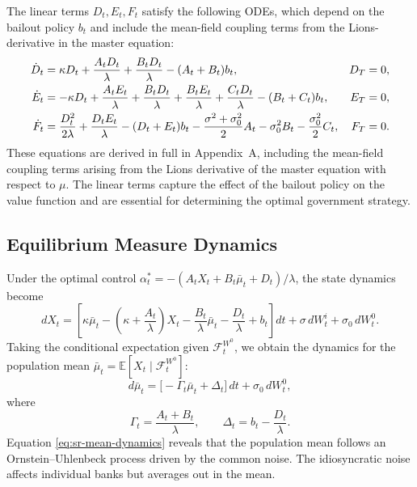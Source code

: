 The linear terms $D_t, E_t, F_t$ satisfy the following ODEs, which depend on the
bailout policy $b_t$ and include the mean-field coupling terms from the
Lions-derivative in the master equation:
\begin{align}
    \dot{D}_t &= \kappa D_t + \frac{A_t D_t}{\lambda} + \frac{B_t D_t}{\lambda}
        - (A_t+B_t) b_t, & D_T &= 0,
        \notag \\
    \dot{E}_t &= -\kappa D_t + \frac{A_t E_t}{\lambda} + \frac{B_t D_t}{\lambda}
        + \frac{B_t E_t}{\lambda} + \frac{C_t D_t}{\lambda}
        - (B_t+C_t) b_t, & E_T
        &= 0, \label{eq:sr-riccati-linear} \\
    \dot{F}_t &= \frac{D_t^2}{2\lambda} + \frac{D_t E_t}{\lambda}
        - (D_t+E_t) b_t - \frac{\sigma^2+\sigma_0^2}{2} A_t
        - \sigma_0^2 B_t - \frac{\sigma_0^2}{2} C_t, & F_T &= 0. \notag
\end{align}
These equations are derived in full in Appendix~A, including the mean-field coupling
terms arising from the Lions derivative of the master equation with respect to $\mu$.
The linear terms capture the effect of
the bailout policy on the value function and are essential for determining the
optimal government strategy.

\subsection{Equilibrium Measure Dynamics}

Under the optimal control $\alpha_t^* = -(A_t X_t + B_t \bar\mu_t + D_t)/\lambda$,
the state dynamics become
\[
    dX_t = \left[ \kappa\bar\mu_t - \left(\kappa + \frac{A_t}{\lambda}\right) X_t -
    \frac{B_t}{\lambda}\bar\mu_t - \frac{D_t}{\lambda} + b_t \right] dt + \sigma\,
    dW_t^i + \sigma_0\, dW_t^0.
\]
Taking the conditional expectation given $\mathcal{F}_t^{W^0}$, we obtain the
dynamics for the population mean $\bar\mu_t = \mathbb{E}[X_t \mid
\mathcal{F}_t^{W^0}]$:
\begin{equation}
    d\bar\mu_t = \big[ -\Gamma_t \bar\mu_t + \Delta_t \big]\, dt + \sigma_0\, dW_t^0,
    \label{eq:sr-mean-dynamics}
\end{equation}
where
\[
    \Gamma_t = \frac{A_t + B_t}{\lambda}, \qquad \Delta_t = b_t - \frac{D_t}{\lambda}.
\]
Equation \eqref{eq:sr-mean-dynamics} reveals that the population mean follows an
Ornstein--Uhlenbeck process driven by the common noise. The idiosyncratic noise
affects individual banks but averages out in the mean.

